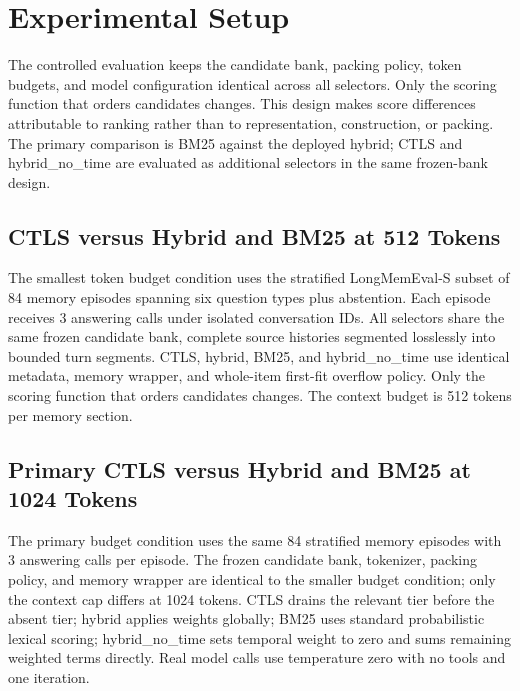 \section{Experimental Setup}

\label{sec:experiments}

The controlled evaluation keeps the candidate bank, packing policy, token budgets, and model configuration identical across all selectors. Only the scoring function that orders candidates changes. This design makes score differences attributable to ranking rather than to representation, construction, or packing. The primary comparison is BM25 against the deployed hybrid; CTLS and hybrid\_no\_time are evaluated as additional selectors in the same frozen-bank design.

\subsection{CTLS versus Hybrid and BM25 at 512 Tokens}

\label{sec:setup_fair_baselines_512}

The smallest token budget condition uses the stratified LongMemEval-S subset of 84 memory episodes spanning six question types plus abstention. Each episode receives 3 answering calls under isolated conversation IDs. All selectors share the same frozen candidate bank, complete source histories segmented losslessly into bounded turn segments. CTLS, hybrid, BM25, and hybrid\_no\_time use identical metadata, memory wrapper, and whole-item first-fit overflow policy. Only the scoring function that orders candidates changes. The context budget is 512 tokens per memory section.

\subsection{Primary CTLS versus Hybrid and BM25 at 1024 Tokens}

\label{sec:setup_fair_baselines}

The primary budget condition uses the same 84 stratified memory episodes with 3 answering calls per episode. The frozen candidate bank, tokenizer, packing policy, and memory wrapper are identical to the smaller budget condition; only the context cap differs at 1024 tokens. CTLS drains the relevant tier before the absent tier; hybrid applies weights globally; BM25 uses standard probabilistic lexical scoring; hybrid\_no\_time sets temporal weight to zero and sums remaining weighted terms directly. Real model calls use temperature zero with no tools and one iteration.

